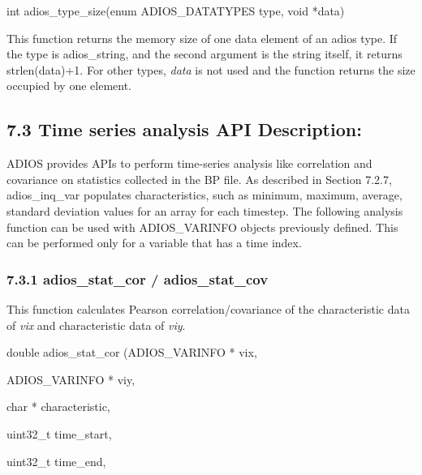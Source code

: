 \vspace{10pt}
int adios\_type\_size(enum ADIOS\_DATATYPES type, void *data)

\vspace{22pt}
This function returns the memory size of one data element of an adios type. If 
the type is adios\_string, and the second argument is the string itself, it returns 
strlen(data)+1. For other types, \textit{data} is not used and the function returns 
the size occupied by one element.\label{HToc182553411}

\vspace{10pt}
\subsection*{{\large 7.3 }{\large \textbf{Time series analysis API Description:}}}

\vspace{10pt}
ADIOS provides APIs to perform time-series analysis like correlation and covariance 
on statistics collected in the BP file. As described in Section 7.2.7, adios\_inq\_var 
populates characteristics, such as minimum, maximum, average, standard deviation 
values for an array for each timestep. The following analysis function can be used 
with ADIOS\_VARINFO objects previously defined. This can be performed only for 
a variable that has a time index.\label{HToc182553412}

\vspace{10pt}
\subsubsection*{{\large \textbf{7.3.1 adios\_stat\_cor / adios\_stat\_cov}}}

\vspace{10pt}
This function calculates Pearson correlation/covariance of the characteristic data 
of \textit{vix} and characteristic data of \textit{viy}.

\vspace{10pt}
double adios\_stat\_cor (ADIOS\_VARINFO * vix, 

\vspace{10pt}
ADIOS\_VARINFO * viy, 

\vspace{10pt}
\parindent=64pt
char          * characteristic, 

\vspace{10pt}
\parindent=46pt
uint32\_t        time\_start, 

\vspace{10pt}
\parindent=28pt
uint32\_t        time\_end, 

